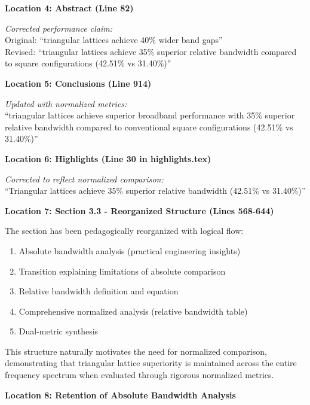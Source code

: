 \documentclass[11pt,a4paper]{article}
\newenvironment{changesbox}{%
    \par\medskip\noindent{\color{changescolor}\rule{\linewidth}{2pt}}\par
    \noindent{\color{changescolor}\bfseries Manuscript Changes}\par\smallskip
}{%
    \par\noindent{\color{changescolor}\rule{\linewidth}{0.5pt}}\medskip
}
\begin{document}
\begin{changesbox}
\textbf{Location 4: Abstract (Line 82)}

\textit{Corrected performance claim:}\\
Original: ``triangular lattices achieve 40\% wider band gaps''\\
Revised: \textcolor{redtext}{``triangular lattices achieve 35\% superior relative bandwidth compared to square configurations (42.51\% vs 31.40\%)''}

\textbf{Location 5: Conclusions (Line 914)}

\textit{Updated with normalized metrics:}\\
\textcolor{redtext}{``triangular lattices achieve superior broadband performance with 35\% superior relative bandwidth compared to conventional square configurations (42.51\% vs 31.40\%)''}

\textbf{Location 6: Highlights (Line 30 in highlights.tex)}

\textit{Corrected to reflect normalized comparison:}\\
\textcolor{redtext}{``Triangular lattices achieve 35\% superior relative bandwidth (42.51\% vs 31.40\%)''}

\textbf{Location 7: Section 3.3 - Reorganized Structure (Lines 568-644)}

The section has been pedagogically reorganized with logical flow:
\begin{enumerate}
    \item Absolute bandwidth analysis (practical engineering insights)
    \item Transition explaining limitations of absolute comparison
    \item Relative bandwidth definition and equation
    \item Comprehensive normalized analysis (relative bandwidth table)
    \item Dual-metric synthesis
\end{enumerate}

This structure naturally motivates the need for normalized comparison, demonstrating that triangular lattice superiority is maintained across the entire frequency spectrum when evaluated through rigorous normalized metrics.

\textbf{Location 8: Retention of Absolute Bandwidth Analysis}


\end{changesbox}
\end{document}

